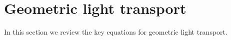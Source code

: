 \section{Geometric light transport}

In this section we review the key equations for geometric light transport.

